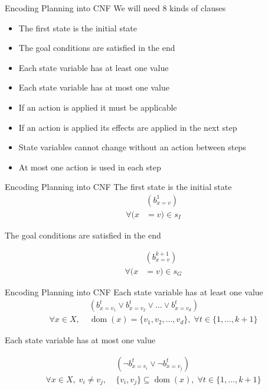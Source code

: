 \documentclass[t]{sdqbeamer}
\begin{document}
\begin{frame}{Encoding Planning into CNF}
We will need 8 kinds of clauses
\begin{itemize}
	\item The first state is the initial state
	\item The goal conditions are satisfied in the end
	\item Each state variable has at least one value
	\item Each state variable has at most one value
	\item If an action is applied it must be applicable
	\item If an action is applied its effects are applied in the next step
	\item State variables cannot change without an action between steps
	\item At most one action is used in each step
\end{itemize}
\end{frame}



\begin{frame}{Encoding Planning into CNF}
The first state is the initial state
\begin{equation}
\begin{split}
&(b_{x=v}^1) \\
\forall (x&=v) \in s_I
\end{split}
\end{equation}

The goal conditions are satisfied in the end

\begin{equation}
\begin{split}
&(b_{x=v}^{k+1}) \\
\forall (x&=v) \in s_G
\end{split}
\end{equation}
\end{frame}

\begin{frame}{Encoding Planning into CNF}
Each state variable has at least one value
\begin{equation}
\label{eq2-1}
\begin{split}
&(b_{x=v_1}^t \vee b_{x=v_2}^t \vee \dots \vee b_{x=v_d}^t) \\
\forall x \in X,\; &\operatorname{dom}(x)=\{v_1, v_2, \dots, v_d\},\; \forall t \in \{1,\dots,k+1\}
\end{split}
\end{equation}

Each state variable has at most one value

\begin{equation}
\label{eq2-2}
\begin{split}
&(\neg b_{x=v_i}^t \vee \neg b_{x=v_j}^t)\\
\forall x \in X,\; v_i \neq v_j,\;& \{v_i,v_j\} \subseteq \operatorname{dom}(x),\; \forall t \in \{1,\dots,k+1\}
\end{split}
\end{equation}
\end{frame}
\end{document}

